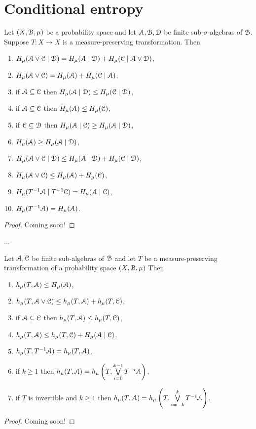 \section{Conditional entropy}
\begin{theorem}\label{thm:walters-4.3}
	Let $(X, \mathcal{B}, \mu)$ be a probability space and let $\mathcal{A}, \mathcal{B}, \mathcal{D}$ be finite sub-$\sigma$-algebras of $\mathcal{B}$. Suppose $T : X \to X$ is a measure-preserving transformation. Then
	\begin{enumerate}
		\item $H_\mu(\mathcal{A} \vee \mathcal{C} \mid \mathcal{D}) = H_\mu(\mathcal{A} \mid \mathcal{D}) + H_\mu(\mathcal{C} \mid \mathcal{A} \vee \mathcal{D})$,
		\item $H_\mu(\mathcal{A} \vee \mathcal{C}) = H_\mu(\mathcal{A}) + H_\mu(\mathcal{C} \mid \mathcal{A})$,
		\item if $\mathcal{A} \subseteq \mathcal{C}$  then $H_\mu(\mathcal{A} \mid \mathcal{D}) \leq H_\mu(\mathcal{C} \mid \mathcal{D})$,
		\item if $\mathcal{A} \subseteq \mathcal{C}$  then $H_\mu(\mathcal{A}) \leq H_\mu(\mathcal{C})$,
		\item if $\mathcal{C} \subseteq \mathcal{D}$ then $H_\mu(\mathcal{A} \mid \mathcal{C}) \geq H_\mu(\mathcal{A} \mid \mathcal{D})$,
		\item $H_\mu(\mathcal{A}) \geq H_\mu(\mathcal{A} \mid \mathcal{D})$,
		\item $H_\mu(\mathcal{A} \vee \mathcal{C} \mid \mathcal{D}) \leq H_\mu(\mathcal{A} \mid \mathcal{D}) + H_\mu(\mathcal{C} \mid \mathcal{D})$,
		\item $H_\mu(\mathcal{A} \vee \mathcal{C}) \leq H_\mu(\mathcal{A}) + H_\mu(\mathcal{C})$,
		\item $H_\mu(T^{-1}\mathcal{A} \mid T^{-1}\mathcal{C}) = H_\mu(\mathcal{A} \mid \mathcal{C})$,
		\item $H_\mu(T^{-1}\mathcal{A}) = H_\mu(\mathcal{A})$.
	\end{enumerate}
	\begin{proof}
		Coming soon!
	\end{proof}
\end{theorem}

...

\begin{theorem}\label{thm:walters-4.12}
	Let $\mathcal{A}, \mathcal{C}$ be finite sub-algebras of $\mathcal{B}$ and let $T$ be a measure-preserving transformation of a probability space $(X, \mathcal{B}, \mu)$ Then
	\begin{enumerate}
		\item $h_\mu(T, \mathcal{A}) \leq H_\mu(\mathcal{A})$,
		\item $h_\mu(T, \mathcal{A} \vee \mathcal{C}) \leq h_\mu(T, \mathcal{A}) + h_\mu(T, \mathcal{C})$,
		\item if $\mathcal{A} \subseteq \mathcal{C}$ then $h_\mu(T, \mathcal{A}) \leq h_\mu(T, \mathcal{C})$,
		\item $h_\mu(T, \mathcal{A}) \leq h_\mu(T, \mathcal{C}) + H_\mu(\mathcal{A} \mid \mathcal{C})$,
		\item $h_\mu(T, T^{-1}{\mathcal{A}}) = h_\mu(T, \mathcal{A})$,
		\item if $k \geq 1$ then $h_\mu(T, \mathcal{A}) = h_\mu\left(T, \bigvee\limits_{i = 0}^{k - 1}{T^{-i}{\mathcal{A}}}\right)$,
		\item if $T$ is invertible and $k \geq 1$ then $h_\mu(T, \mathcal{A}) = h_\mu\left(T, \bigvee\limits_{i = -k}^k{T^{-i}{\mathcal{A}}}\right)$.
	\end{enumerate}
	\begin{proof}
		Coming soon!
	\end{proof}
\end{theorem}
